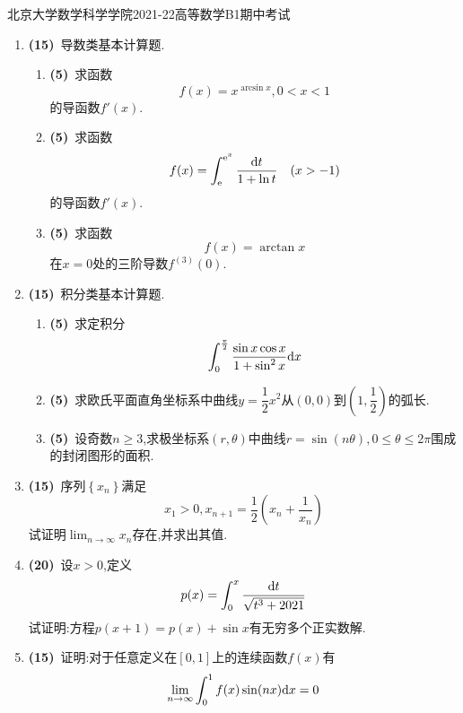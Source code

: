 \documentclass{ctexart}
\begin{document}
\pagestyle{empty}
\begin{center}\Large
    北京大学数学科学学院2021-22高等数学B1期中考试
\end{center}
\begin{enumerate}[leftmargin=*,label=\textbf{\arabic*.},topsep=0pt,parsep=0pt,itemsep=0pt,partopsep=0pt]
    \item \textbf{(15)}\ 导数类基本计算题.
    \begin{enumerate}[label=\textbf{(\arabic*)}]
        \item \textbf{(5)}\ 求函数$$f(x)=x^{\arcsin x},0<x<1$$的导函数$f'(x)$.
        \item \textbf{(5)}\ 求函数$$f(x)=\int_{\mathrm{e}}^{\mathrm{e}^x}\dfrac{\mathrm{d} t}{1+\ln t}\quad(x>-1)$$的导函数$f'(x)$.
        \item \textbf{(5)}\ 求函数$$f(x)=\arctan x$$在$x=0$处的三阶导数$f^{(3)}(0)$.
    \end{enumerate}

    \item \textbf{(15)}\ 积分类基本计算题.
    \begin{enumerate}[label=\textbf{(\arabic*)}]
        \item \textbf{(5)}\ 求定积分$$\int_{0}^{\frac{\pi}{2}}{\dfrac{\sin x\cos x}{1+\sin^2x}\mathrm{d} x}$$
        \item \textbf{(5)}\ 求欧氏平面直角坐标系中曲线$y=\dfrac{1}{2}x^2$从$(0,0)$到$\left(1,\dfrac{1}{2}\right)$的弧长.
        \item \textbf{(5)}\ 设奇数$n\geqslant3$,求极坐标系$(r,\theta)$中曲线$r=\sin(n\theta),0\leqslant\theta\leqslant2\pi$围成的封闭图形的面积.
    \end{enumerate}

    \item \textbf{(15)}\ 序列$\left\{x_n\right\}$满足
    $$x_1>0,x_{n+1}=\dfrac{1}{2}\left(x_n+\dfrac{1}{x_n}\right)$$
    试证明$\displaystyle\lim_{n\to\infty}x_n$存在,并求出其值.

    \item \textbf{(20)}\ 设$x>0$,定义$$p(x)=\int_0^x\dfrac{\mathrm{d} t}{\sqrt{t^3+2021}}$$
    试证明:方程$p(x+1)=p(x)+\sin x$有无穷多个正实数解.

    \item \textbf{(15)}\ 证明:对于任意定义在$[0,1]$上的连续函数$f(x)$有$$\lim_{n\to\infty}\int_0^1f(x)\sin(nx)\mathrm{d} x=0$$


\end{enumerate}
\end{document}
